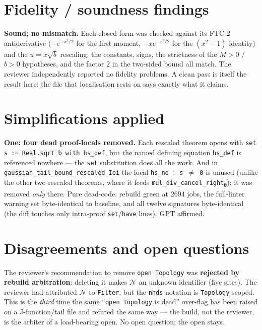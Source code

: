 \documentclass[11pt]{article}
\begin{document}
\section{Fidelity / soundness findings}
\textbf{Sound; no mismatch.} Each closed form was checked against its FTC-2 antiderivative
($-e^{-x^2/2}$ for the first moment, $-x e^{-x^2/2}$ for the $(x^2-1)$ identity) and the
$u=x\sqrt b$ rescaling; the constants, signs, the strictness of the $M>0$ / $b>0$ hypotheses, and
the factor $2$ in the two-sided bound all match. The reviewer independently reported no fidelity
problems. A clean pass is itself the result here: the file that localisation rests on says exactly
what it claims.

\section{Simplifications applied}
\textbf{One: four dead proof-locals removed.} Each rescaled theorem opens with
\texttt{set s := Real.sqrt b with hs\_def}, but the named defining equation \texttt{hs\_def} is
referenced nowhere --- the \texttt{set} substitution does all the work. And in
\texttt{gaussian\_tail\_bound\_rescaled\_Ioi} the local \texttt{hs\_ne : s $\ne$ 0} is unused
(unlike the other two rescaled theorems, where it feeds \texttt{mul\_div\_cancel\_right\textsubscript{0}});
it was removed \emph{only} there. Pure dead-code: rebuild green at $2694$ jobs, the full-linter
warning set byte-identical to baseline, and all twelve signatures byte-identical (the diff touches
only intra-proof \texttt{set}/\texttt{have} lines). GPT affirmed.

\section{Disagreements and open questions}
The reviewer's recommendation to remove \texttt{open Topology} was \textbf{rejected by rebuild
arbitration}: deleting it makes \texttt{$\mathcal N$} an unknown identifier (five sites). The
reviewer had attributed \texttt{$\mathcal N$} to \texttt{Filter}, but the \texttt{nhds} notation is
\texttt{Topology}-scoped. This is the \emph{third} time the same ``\texttt{open Topology} is dead''
over-flag has been raised on a J-function/tail file and refuted the same way --- the build, not the
reviewer, is the arbiter of a load-bearing open. No open question; the open stays.
\end{document}

